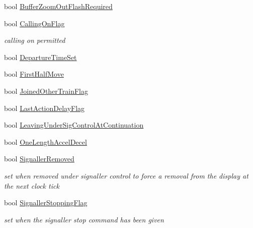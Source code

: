 \begin{DoxyCompactItemize}
bool \mbox{\hyperlink{class_t_train_a60a3a9bebf64411f5d200682575a69ee}{Buffer\+Zoom\+Out\+Flash\+Required}}
\item 
\mbox{\label{class_t_train_a5a658cdc377c3f4d65af6839614e7cb1}} 
bool \mbox{\hyperlink{class_t_train_a5a658cdc377c3f4d65af6839614e7cb1}{Calling\+On\+Flag}}
\begin{DoxyCompactList}\small\item\em calling on permitted \end{DoxyCompactList}\item 
bool \mbox{\hyperlink{class_t_train_ab4f3876cb58a6160c2f1cd7a7eb3f234}{Departure\+Time\+Set}}
\item 
bool \mbox{\hyperlink{class_t_train_a638de0cfb04b13fb28edd5e61d2d628f}{First\+Half\+Move}}
\item 
bool \mbox{\hyperlink{class_t_train_a843a31af1c4faec4d71a61d32d6f4510}{Joined\+Other\+Train\+Flag}}
\item 
bool \mbox{\hyperlink{class_t_train_a1b53d5506e8a5bdfd55286ae2dc2d3f2}{Last\+Action\+Delay\+Flag}}
\item 
bool \mbox{\hyperlink{class_t_train_ac1ce3c1b548c1e4199d211b5fcd9763e}{Leaving\+Under\+Sig\+Control\+At\+Continuation}}
\item 
bool \mbox{\hyperlink{class_t_train_a36dc9bd48fb78d4257fe117908829dd7}{One\+Length\+Accel\+Decel}}
\item 
\mbox{\label{class_t_train_a4cd38ef44706b5ae6bf0c934e58b4b93}} 
bool \mbox{\hyperlink{class_t_train_a4cd38ef44706b5ae6bf0c934e58b4b93}{Signaller\+Removed}}
\begin{DoxyCompactList}\small\item\em set when removed under signaller control to force a removal from the display at the next clock tick \end{DoxyCompactList}\item 
\mbox{\label{class_t_train_a559e8f1636c83d03463d6c901ae39567}} 
bool \mbox{\hyperlink{class_t_train_a559e8f1636c83d03463d6c901ae39567}{Signaller\+Stopping\+Flag}}
\begin{DoxyCompactList}\small\item\em set when the signaller stop command has been given \end{DoxyCompactList}\item 
\mbox{\label{class_t_train_a0f044ad19728cee6dd0b6baadec4648b}} 

\end{DoxyCompactItemize}
